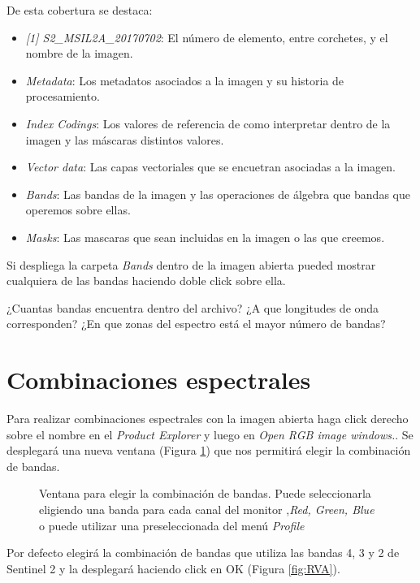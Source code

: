 \documentclass[a4paper,12pt]{book}
\begin{document}
De esta cobertura se destaca:

\begin{itemize}
    \item \emph{[1] S2\_MSIL2A\_20170702}: El número de elemento, entre corchetes, y el nombre de la imagen.
    \item \emph{Metadata}: Los metadatos asociados a la imagen y su historia de procesamiento.
    \item \emph{Index Codings}: Los valores de referencia de como interpretar dentro de la imagen y las máscaras distintos valores.
    \item \emph{Vector data}: Las capas vectoriales que se encuetran asociadas a la imagen.
    \item \emph{Bands}: Las bandas de la imagen y las operaciones de álgebra que bandas que operemos sobre ellas.
    \item \emph{Masks}: Las mascaras que sean incluidas en la imagen o las que creemos.
\end{itemize}

Si despliega la carpeta \emph{Bands} dentro de la imagen abierta pueded mostrar cualquiera de las bandas haciendo doble click sobre ella.

\begin{que}
    ¿Cuantas bandas encuentra dentro del archivo? ¿A que longitudes de onda corresponden? ¿En que zonas del espectro está el mayor número de bandas?
\end{que}

\section{Combinaciones espectrales}

Para realizar combinaciones espectrales con la imagen abierta haga click derecho sobre el nombre en el \emph{Product Explorer} y luego en \emph{Open RGB image windows.}. Se desplegará una nueva ventana (Figura \ref{fig:RGB}) que nos permitirá elegir la combinación de bandas.

\begin{figure}[h]
    \centering
    \caption{Ventana para elegir la combinación de bandas. Puede seleccionarla eligiendo una banda para cada canal del monitor ,\emph{Red, Green, Blue} o puede utilizar una preseleccionada del menú \emph{Profile}}
    \label{fig:RGB}
\end{figure}

Por defecto elegirá la combinación de bandas que utiliza las bandas 4, 3 y 2 de Sentinel 2 y la desplegará haciendo click en OK (Figura \ref{fig:RVA}).
\end{document}
